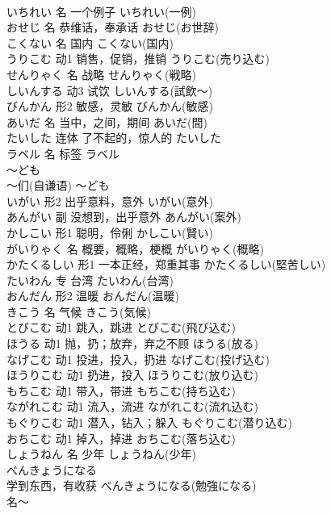 \documentclass[8pt]{extreport}
\begin{document}
\begin{CJK}{UTF8}{min}
\\	いちれい	名	一个例子	いちれい(一例)	
\\	おせじ	名	恭维话，奉承话	おせじ(お世辞)	
\\	こくない	名	国内	こくない(国内)	
\\	うりこむ	动1	销售，促销，推销	うりこむ(売り込む)	
\\	せんりゃく	名	战略	せんりゃく(戦略)	
\\	しいんする	动3	试饮	しいんする(試飲～)	
\\	びんかん	形2	敏感，灵敏	びんかん(敏感)	
\\	あいだ	名	当中，之间，期间	あいだ(間)	
\\	たいした	连体	了不起的，惊人的	たいした	
\\	ラベル	名	标签	ラベル	
\\	～ども	
\\	～们(自谦语)	～ども	
\\	いがい	形2	出乎意料，意外	いがい(意外)	
\\	あんがい	副	没想到，出乎意外	あんがい(案外)	
\\	かしこい	形1	聪明，伶俐	かしこい(賢い)	
\\	がいりゃく	名	概要，概略，梗概	がいりゃく(概略)	
\\	かたくるしい	形1	一本正经，郑重其事	かたくるしい(堅苦しい)	
\\	たいわん	专	台湾	たいわん(台湾)	
\\	おんだん	形2	温暖	おんだん(温暖)	
\\	きこう	名	气候	きこう(気候)	
\\	とびこむ	动1	跳入，跳进	とびこむ(飛び込む)	
\\	ほうる	动1	抛，扔；放弃，弃之不顾	ほうる(放る)	
\\	なげこむ	动1	投进，投入，扔进	なげこむ(投げ込む)	
\\	ほうりこむ	动1	扔进，投入	ほうりこむ(放り込む)	
\\	もちこむ	动1	带入，带进	もちこむ(持ち込む)	
\\	ながれこむ	动1	流入，流进	ながれこむ(流れ込む)	
\\	もぐりこむ	动1	潜入，钻入；躲入	もぐりこむ(潜り込む)	
\\	おちこむ	动1	掉入，掉进	おちこむ(落ち込む)	
\\	しょうねん	名	少年	しょうねん(少年)	
\\	べんきょうになる	
\\	学到东西，有收获	べんきょうになる(勉強になる)	
\\	名～	

\end{CJK}
\end{document}
